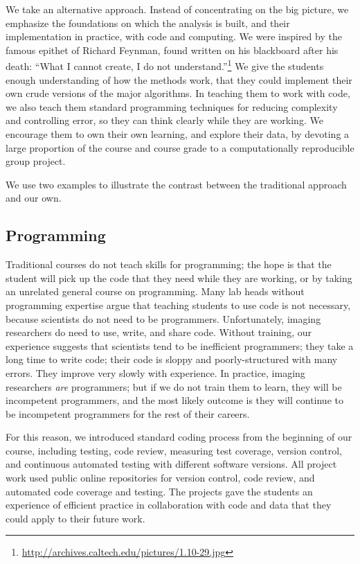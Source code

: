 We take an alternative approach.  Instead of
concentrating on the big picture, we emphasize the foundations on which the
analysis is built, and their implementation in practice, with code and
computing.  We were inspired by the famous epithet of Richard Feynman, found
written on his blackboard after his death: ``What I cannot create, I do not
understand.''\footnote{\url{http://archives.caltech.edu/pictures/1.10-29.jpg}}
We give the students enough understanding of how the methods work, that
they could implement their own crude versions of the major algorithms.  In
teaching them to work with code, we also teach them standard programming
techniques for reducing complexity and controlling error, so they can think
clearly while they are working.  We encourage them to own their own learning,
and explore their data, by devoting a large proportion of the course and
course grade to a computationally reproducible group project.

We use two examples to illustrate the contrast between the
traditional approach and our own.

\subsection{Programming}

Traditional courses do not teach skills for programming; the hope is that the
student will pick up the code that they need while they are working, or by
taking an unrelated general course on programming.  Many lab heads without
programming expertise argue that teaching students to use code is not
necessary, because scientists do not need to be programmers.  Unfortunately,
imaging researchers do need to use, write, and share code.  Without training,
our experience suggests that scientists tend to be inefficient programmers;
they take a long time to write code; their code is sloppy and
poorly-structured with many errors.  They improve very slowly with experience.
In practice, imaging researchers {\em are} programmers; but if we do not train
them to learn, they will be incompetent programmers, and the most likely
outcome is they will continue to be incompetent programmers for the rest of
their careers.

For this reason, we introduced standard coding process from the beginning of
our course, including testing, code review, measuring test coverage, version
control, and continuous automated testing with different software versions.
All project work used public online repositories for version control,
code review, and automated code coverage and testing.  The projects gave the
students an experience of efficient practice in collaboration with code and
data that they could apply to their future work.

